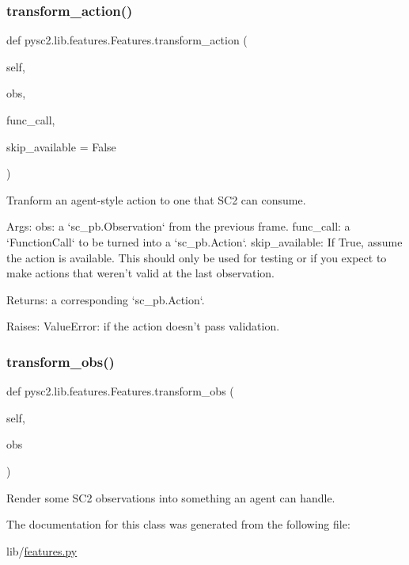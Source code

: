 \subsubsection{\texorpdfstring{transform\+\_\+action()}{transform\_action()}}
{\footnotesize\ttfamily def pysc2.\+lib.\+features.\+Features.\+transform\+\_\+action (\begin{DoxyParamCaption}\item[{}]{self,  }\item[{}]{obs,  }\item[{}]{func\+\_\+call,  }\item[{}]{skip\+\_\+available = {\ttfamily False} }\end{DoxyParamCaption})}

\begin{DoxyVerb}Tranform an agent-style action to one that SC2 can consume.

Args:
  obs: a `sc_pb.Observation` from the previous frame.
  func_call: a `FunctionCall` to be turned into a `sc_pb.Action`.
  skip_available: If True, assume the action is available. This should only
  be used for testing or if you expect to make actions that weren't
  valid at the last observation.

Returns:
  a corresponding `sc_pb.Action`.

Raises:
  ValueError: if the action doesn't pass validation.
\end{DoxyVerb}
 \mbox{\label{classpysc2_1_1lib_1_1features_1_1_features_a79fe09a0d35b8d7b6f761da2ddc72f67}} 
\subsubsection{\texorpdfstring{transform\+\_\+obs()}{transform\_obs()}}
{\footnotesize\ttfamily def pysc2.\+lib.\+features.\+Features.\+transform\+\_\+obs (\begin{DoxyParamCaption}\item[{}]{self,  }\item[{}]{obs }\end{DoxyParamCaption})}

\begin{DoxyVerb}Render some SC2 observations into something an agent can handle.\end{DoxyVerb}
 

The documentation for this class was generated from the following file\+:\begin{DoxyCompactItemize}
\item 
lib/\mbox{\hyperlink{features_8py}{features.\+py}}\end{DoxyCompactItemize}

